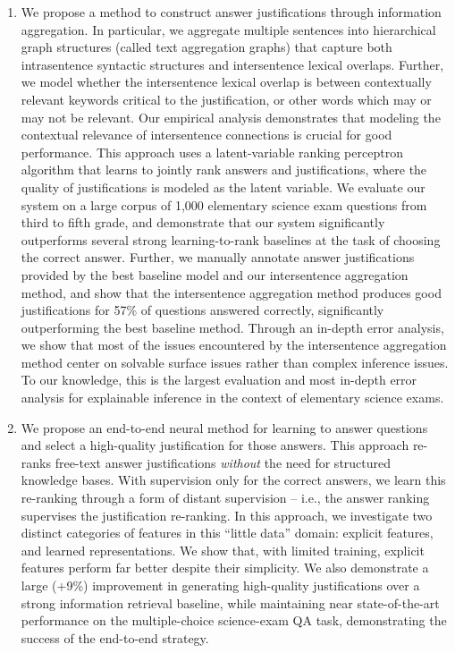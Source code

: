 \begin{enumerate}
\item We propose a method to construct answer justifications through information aggregation. 
In particular, we aggregate multiple sentences into hierarchical graph structures (called text aggregation graphs) that capture both intrasentence syntactic structures and intersentence lexical overlaps. 
Further, we model whether the intersentence lexical overlap is between contextually relevant keywords critical to the justification, or other words which may or may not be relevant. 
Our empirical analysis demonstrates that modeling the contextual relevance of intersentence connections is crucial for good performance.  %
This approach uses a latent-variable ranking perceptron algorithm that learns to jointly rank answers and justifications, where the quality of justifications is modeled as the latent variable. 
We evaluate our system on a large corpus of 1,000 elementary science exam questions from third to fifth grade, and demonstrate that our system significantly outperforms several strong learning-to-rank baselines at the task of choosing the correct answer.  Further, we manually annotate answer justifications provided by the best baseline model and our intersentence aggregation method, and show that the intersentence aggregation method produces good justifications for 57\% of questions answered correctly, significantly outperforming the best baseline method. 
Through an in-depth error analysis, we show that most of the issues encountered by the intersentence aggregation method center on solvable surface issues rather than complex inference issues.  To our knowledge, this is the largest evaluation and most in-depth error analysis for explainable inference in the context of elementary science exams. 


\item We propose an end-to-end neural method for learning to answer questions and select a high-quality justification for those answers. 
This approach re-ranks free-text answer justifications \emph{without} the need for structured knowledge bases. 
With supervision only for the correct answers, we learn this re-ranking through a form of distant supervision -- i.e., the answer ranking supervises the justification re-ranking. In this approach, we investigate two distinct categories of features in this ``little data'' domain: explicit features, and learned representations. We show that, with limited training, explicit features perform far better despite their simplicity.  We also demonstrate a large (+9\%) improvement in generating high-quality justifications over a strong information retrieval baseline, while maintaining near state-of-the-art performance on the multiple-choice science-exam QA task, demonstrating the success of the end-to-end strategy.

\end{enumerate}

